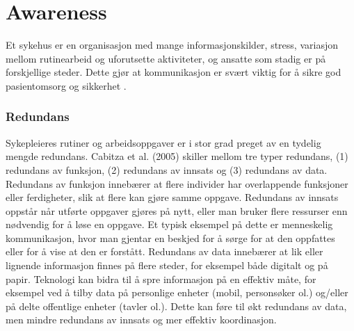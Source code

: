 \section{Awareness}
\label{chp: awareness}

Et sykehus er en organisasjon med mange informasjonskilder, stress, variasjon mellom rutinearbeid og uforutsette aktiviteter, og ansatte som stadig er på forskjellige steder. Dette gjør at kommunikasjon er svært viktig for å sikre god pasientomsorg og sikkerhet \cite{Klemets12}.

\subsubsection{Redundans}
Sykepleieres rutiner og arbeidsoppgaver er i stor grad preget av en tydelig mengde redundans. Cabitza et al. (2005) skiller mellom tre typer redundans, (1) redundans av funksjon, (2) redundans av innsats og (3) redundans av data. 
Redundans av funksjon innebærer at flere individer har overlappende funksjoner eller ferdigheter, slik at flere kan gjøre samme oppgave. Redundans av innsats oppstår når utførte oppgaver gjøres på nytt, eller man bruker flere ressurser enn nødvendig for å løse en oppgave. Et typisk eksempel på dette er menneskelig kommunikasjon, hvor man gjentar en beskjed for å sørge for at den oppfattes eller for å vise at den er forstått. Redundans av data innebærer at lik eller lignende informasjon finnes på flere steder, for eksempel både  digitalt og på papir. Teknologi kan bidra til å spre informasjon på en effektiv måte, for eksempel ved å tilby data på personlige enheter (mobil, personsøker ol.) og/eller på delte offentlige enheter (tavler ol.). Dette kan føre til økt redundans av data, men mindre redundans av innsats og mer effektiv koordinasjon.

